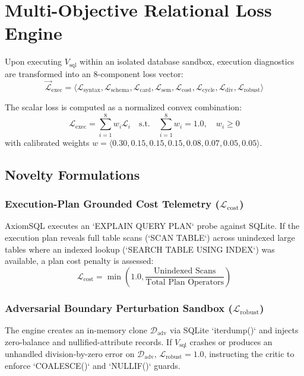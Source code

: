 \documentclass[conference]{IEEEtran}
\begin{document}
\section{Multi-Objective Relational Loss Engine}

Upon executing $V_{\text{sql}}$ within an isolated database sandbox, execution diagnostics are transformed into an 8-component loss vector:
\begin{equation}
    \vec{\mathcal{L}}_{\text{exec}} = \langle \mathcal{L}_{\text{syntax}}, \mathcal{L}_{\text{schema}}, \mathcal{L}_{\text{card}}, \mathcal{L}_{\text{sem}}, \mathcal{L}_{\text{cost}}, \mathcal{L}_{\text{cycle}}, \mathcal{L}_{\text{div}}, \mathcal{L}_{\text{robust}} \rangle
\end{equation}

The scalar loss is computed as a normalized convex combination:
\begin{equation}
    \mathcal{L}_{\text{exec}} = \sum_{i=1}^8 w_i \mathcal{L}_i \quad \text{s.t.} \quad \sum_{i=1}^8 w_i = 1.0, \quad w_i \ge 0
\end{equation}
with calibrated weights $w = \langle 0.30, 0.15, 0.15, 0.15, 0.08, 0.07, 0.05, 0.05 \rangle$.

\subsection{Novelty Formulations}

\subsubsection{Execution-Plan Grounded Cost Telemetry ($\mathcal{L}_{\text{cost}}$)}
AxiomSQL executes an `EXPLAIN QUERY PLAN` probe against SQLite. If the execution plan reveals full table scans (`SCAN TABLE`) across unindexed large tables where an indexed lookup (`SEARCH TABLE USING INDEX`) was available, a plan cost penalty is assessed:
\begin{equation}
    \mathcal{L}_{\text{cost}} = \min\left(1.0, \frac{\text{Unindexed Scans}}{\text{Total Plan Operators}}\right)
\end{equation}

\subsubsection{Adversarial Boundary Perturbation Sandbox ($\mathcal{L}_{\text{robust}}$)}
The engine creates an in-memory clone $\mathcal{D}_{\text{adv}}$ via SQLite `iterdump()` and injects zero-balance and nullified-attribute records. If $V_{\text{sql}}$ crashes or produces an unhandled division-by-zero error on $\mathcal{D}_{\text{adv}}$, $\mathcal{L}_{\text{robust}} = 1.0$, instructing the critic to enforce `COALESCE()` and `NULLIF()` guards.
\end{document}
